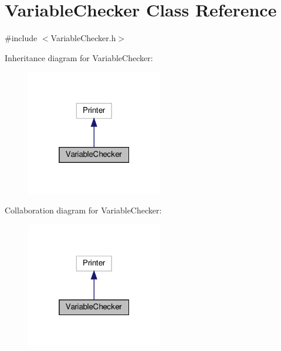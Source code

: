 \hypertarget{classVariableChecker}{}\section{Variable\+Checker Class Reference}
\label{classVariableChecker}


{\ttfamily \#include $<$Variable\+Checker.\+h$>$}



Inheritance diagram for Variable\+Checker\+:\nopagebreak
\begin{figure}[H]
\begin{center}
\leavevmode
\includegraphics[width=169pt]{classVariableChecker__inherit__graph}
\end{center}
\end{figure}


Collaboration diagram for Variable\+Checker\+:\nopagebreak
\begin{figure}[H]
\begin{center}
\leavevmode
\includegraphics[width=169pt]{classVariableChecker__coll__graph}
\end{center}
\end{figure}
